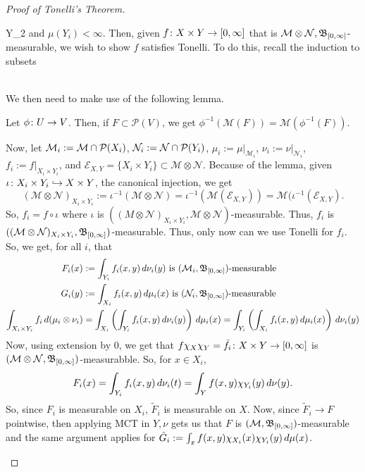 \documentclass[11pt,leqno,oneside]{amsbook}
\numberwithin{thm}{section}
\renewcommand{\P}{\mathcal{P}} %
\newcommand{\M}{\mathcal{M}} %
\newcommand{\Ep}{\mathcal{E}} %
\newcommand{\cN}{\mathcal{N}}
\newcommand{\ox}{\otimes}
\begin{document}
\begin{proof}[Proof of Tonelli's Theorem]
\begin{itemize}
    \subset Y_2 \subset \cdots\) and \(\mu(Y_i) < \infty\). Then,
    given \(f \colon X \times Y \to [0,\infty]\) that is \(\M \ox \cN,
    \B_{[0,\infty]}\)-measurable, we wish to show \(f\) satisfies
    Tonelli. To do this, recall the induction to subsets \\
     \\
    We then need to make use of the following lemma.
    \begin{lem}
      Let \(\phi \colon U \to V\). Then, if \(F \subset \P(V)\), we get
      \(\phi^{-1}(\M(F)) = \M(\phi^{-1}(F))\).
    \end{lem}
    Now, let \(\M_i := \M \intersect \P(X_i)\), \(\cN_i := \cN
    \intersect \P(Y_i)\), \(\mu_i := \mu|_{\M_i}\), \(\nu_i :=
    \nu|_{\cN_i}\), \(f_i := f|_{X_i \times Y_i}\), and \(\Ep_{X,Y} =
    \{X_i \times Y_i\} \subset \M \ox \cN\). 
    Because of the lemma, given \(\iota \colon X_i \times Y_i \hookrightarrow X
    \times Y\), the canonical injection, we get \[
      (\M \ox \cN)_{X_i \times Y_i} := \iota^{-1}(\M \ox \cN) =
      \iota^{-1}(\M(\Ep_{X,Y})) = \M(\iota^{-1}(\Ep_{X,Y}).
    \]
    So, \(f_i = f \circ \iota\) where \(\iota\) is \(((M \ox \cN)_{X_i
    \times Y_i},\M\ox\cN)\)-measurable. Thus, \(f_i\) is \(((\M \ox
    \cN)_{X_i \times Y_i},\B_{[0,\infty]})\)-measurable. Thus, only now
    can we use Tonelli for \(f_i\). \\

    So, we get, for all \(i\), that
    \begin{align*}
      F_i(x) &:= \int_{Y_i} f_i(x,y) \d\nu_i(y) \text{ is
      }(\M_i,\B_{[0,\infty]})\text{-measurable} \\
      G_i(y) &:= \int_{X_i} f_i(x,y) \d\mu_i(x) \text{ is }
      (\cN_i,\B_{[0,\infty]})\text{-measurable} \\
      \int_{X_i \times Y_i} f_i \d(\mu_i \ox \nu_i) & = \int_{X_i}
      \left( \int_{Y_i} f_i(x,y) \d\nu_i(y)\right) \d\mu_i(x) =
      \int_{Y_i} \left( \int_{X_i} f_i(x,y) \d\mu_i(x)\right)\d\nu_i(y)
    \end{align*}
    Now, using extension by 0, we get that \(f \chi_X \chi_Y = \tilde{f}_i \colon X \times
    Y \to [0,\infty]\) is \((\M \ox
    \cN,\B_{[0,\infty]})\)-measurabble. So, for \(x \in X_i\), \[
      F_i(x) = \int_{Y_i} f_i(x,y) \, d\nu_i(t) = \int_Y f(x,y)
      \chi_{Y_i}(y) \, d\nu(y).
    \]
    So, since \(F_i\) is measurable on \(X_i\), \(\tilde{F}_i\) is
    measurable on \(X\). Now, since \(\tilde{F}_i \to F\) pointwise,
    then applying MCT in \(Y,\nu\) gets us that \(F\) is
    \((\M,\B_{[0,\infty]})\)-measurable and the same argument applies
    for \(\tilde{G}_i := \int_x f(x,y)\chi_{X_i}(x) \chi_{Y_i}(y)
    \, d\mu(x)\). \\
    

\end{itemize}
\end{proof}
\end{document}
